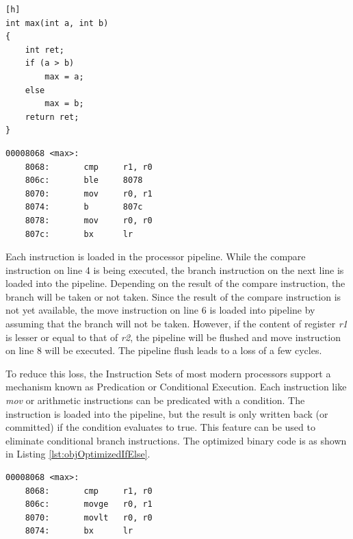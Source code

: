 \begin{center}
\begin{minipage}{0.7\textwidth}
\begin{lstlisting}[caption={Example C Code},label={lst:cIfElse}][h]
int max(int a, int b)
{
    int ret;
    if (a > b)
        max = a;
    else
        max = b;
    return ret;
}
\end{lstlisting}
\end{minipage}
\end{center}

\begin{center}
\begin{minipage}{0.7\textwidth}
\begin{lstlisting}[caption={Object Code},label={lst:objIfElse}]
00008068 <max>:
    8068:       cmp     r1, r0
    806c:       ble     8078   
    8070:       mov     r0, r1
    8074:       b       807c
    8078:       mov     r0, r0
    807c:       bx      lr
\end{lstlisting}
\end{minipage}
\end{center}

Each instruction is loaded in the processor pipeline. While the compare instruction on line 4 is being executed, the branch instruction on the next line is loaded into the pipeline. Depending on the result of the compare instruction, the branch will be taken or not taken. Since the result of the compare instruction is not yet available, the move instruction on line 6 is loaded into pipeline by assuming that the branch will not be taken. However, if the content of register \emph{r1} is lesser or equal to that of \emph{r2}, the pipeline will be flushed and move instruction on line 8 will be executed. The pipeline flush leads to a loss of a few cycles.

To reduce this loss, the Instruction Sets of most modern processors support a mechanism known as Predication or Conditional Execution. Each instruction like \emph{mov} or arithmetic instructions can be predicated with a condition. The instruction is loaded into the pipeline, but the result is only written back (or committed) if the condition evaluates to true. This feature can be used to eliminate conditional branch instructions. The optimized binary code is as shown in Listing \ref{lst:objOptimizedIfElse}.

\begin{center}
\begin{minipage}{0.7\textwidth}
\begin{lstlisting}[caption={Optimized Object Code},label={lst:objOptimizedIfElse}]
00008068 <max>:
    8068:       cmp     r1, r0
    806c:       movge   r0, r1
    8070:       movlt   r0, r0
    8074:       bx      lr
\end{lstlisting}
\end{minipage}
\end{center}

